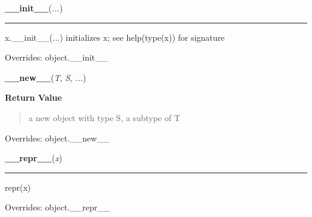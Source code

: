     \vspace{0.5ex}

\hspace{.8\funcindent}\begin{boxedminipage}{\funcwidth}

    \raggedright \textbf{\_\_init\_\_}(\textit{...})

    \vspace{-1.5ex}

    \rule{\textwidth}{0.5\fboxrule}
\setlength{\parskip}{2ex}
    x.\_\_init\_\_(...) initializes x; see help(type(x)) for signature

\setlength{\parskip}{1ex}
      Overrides: object.\_\_init\_\_

    \end{boxedminipage}

    \vspace{0.5ex}

\hspace{.8\funcindent}\begin{boxedminipage}{\funcwidth}

    \raggedright \textbf{\_\_new\_\_}(\textit{T}, \textit{S}, \textit{...})

\setlength{\parskip}{2ex}
\setlength{\parskip}{1ex}
      \textbf{Return Value}
    \vspace{-1ex}

      \begin{quote}
      a new object with type S, a subtype of T

      \end{quote}

      Overrides: object.\_\_new\_\_

    \end{boxedminipage}

    \vspace{0.5ex}

\hspace{.8\funcindent}\begin{boxedminipage}{\funcwidth}

    \raggedright \textbf{\_\_repr\_\_}(\textit{x})

    \vspace{-1.5ex}

    \rule{\textwidth}{0.5\fboxrule}
\setlength{\parskip}{2ex}
    repr(x)

\setlength{\parskip}{1ex}
      Overrides: object.\_\_repr\_\_

    \end{boxedminipage}

